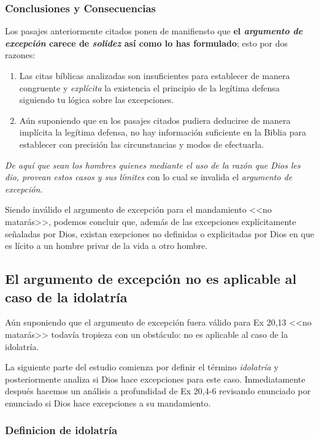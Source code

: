 \documentclass{article}
\begin{document}
\subsubsection{Conclusiones y Consecuencias}

Los pasajes anteriormente citados ponen de manifiensto que \textbf{el \emph{argumento de excepci\'on} carece de \emph{solidez} as\'{i} como lo has formulado}; esto por dos razones:

\begin{enumerate}
\item Las citas b\'{i}blicas analizadas son insuficientes para establecer de manera congruente y \emph{expl\'{i}cita} la existencia el principio de la leg\'{i}tima defensa siguiendo tu l\'ogica sobre las excepciones.
\item A\'un suponiendo que en los pasajes citados pudiera deducirse de manera impl\'{i}cita la leg\'{i}tima defensa, no hay informaci\'on suficiente en la Biblia para establecer con precisi\'on las circunstancias y modos de efectuarla.
\end{enumerate}

\noindent
\emph{De aqu\'{i} que sean los hombres quienes mediante el uso de la raz\'on que Dios les dio, provean estos casos y sus l\'{i}mites} con lo cual se invalida el \emph{argumento de excepci\'on}.

Siendo inv\'alido el argumento de excepci\'on para el mandamiento <<no matar\'as>>, podemos concluir que, adem\'as de las excepciones expl\'{i}citamente se\~naladas por Dios, existan exepciones no definidas o explicitadas por Dios en que es l\'{i}cito a un hombre privar de la vida a otro hombre.

\subsection{El argumento de excepci\'on no es aplicable al caso de la idolatr\'{i}a}

A\'un suponiendo que el argumento de excepci\'on fuera v\'alido para Ex 20,13 <<no matar\'as>> todav\'ia tropieza con un obst\'aculo: no es aplicable al caso de la idolatr\'{i}a.

La siguiente parte del estudio comienza por definir el t\'ermino \emph{idolatr\'{i}a} y posteriormente analiza si Dios hace excepciones para este caso. Inmediatamente despu\'es hacemos un an\'alisis a profundidad de Ex 20,4-6 revisando enunciado por enunciado si Dios hace excepciones a su mandamiento.

\subsubsection{Definicion de idolatr\'{i}a}
\end{document}
